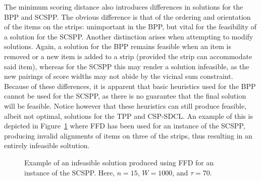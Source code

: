 \documentclass{elsarticle}
\begin{document}
The minimum scoring distance also introduces differences in solutions for the BPP and SCSPP. The obvious difference is that of the ordering and orientation of the items on the strips: unimportant in the BPP, but vital for the feasibility of a solution for the SCSPP. Another distinction arises when attempting to modify solutions. Again, a solution for the BPP remains feasible when an item is removed or a new item is added to a strip (provided the strip can accommodate said item), whereas for the SCSPP this may render a solution infeasible, as the new pairings of score widths may not abide by the vicinal sum constraint. Because of these differences, it is apparent that basic heuristics used for the BPP cannot be used for the SCSPP, as there is no guarantee that the final solution will be feasible. Notice however that these heuristics can still produce feasible, albeit not optimal, solutions for the TPP and CSP-SDCL. An example of this is depicted in Figure~\ref{fig:ffd} where FFD has been used for an instance of the SCSPP, producing invalid alignments of items on three of the strips, thus resulting in an entirely infeasible soltution.

\begin{figure}[H]	
	\centering
	
	\caption{Example of an infeasible solution produced using FFD for an instance of the SCSPP. Here, $n = 15$, $W = 1000$, and $\tau = 70$. }	
	\label{fig:ffd}
\end{figure}
\end{document}
